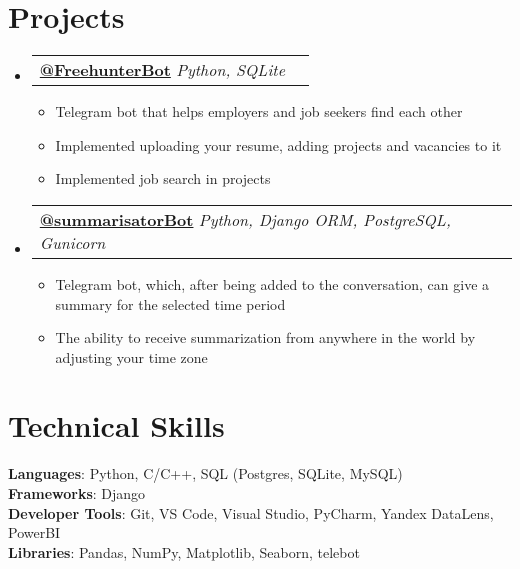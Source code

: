 \documentclass[letterpaper,11pt]{article}
\makeatletter
\newcommand{\resumeItem}[1]{
  \item\small{
    {#1 \vspace{-2pt}}
  }
}
\newcommand{\resumeProjectHeading}[2]{
    \item
    \begin{tabular*}{0.97\textwidth}{l@{\extracolsep{\fill}}r}
      \small#1 & #2 \\
    \end{tabular*}\vspace{-7pt}
}
\newcommand{\resumeSubHeadingListStart}{\begin{itemize}[leftmargin=0.15in, label={}]}
\newcommand{\resumeSubHeadingListEnd}{\end{itemize}}
\newcommand{\resumeItemListStart}{\begin{itemize}}
\newcommand{\resumeItemListEnd}{\end{itemize}\vspace{-5pt}}
\makeatother
\begin{document}
\section{Projects}
    \resumeSubHeadingListStart
      \resumeProjectHeading
        {\textbf{\href{https://t.me/Free_hunterBot}{@FreehunterBot}}
          \emph{Python, SQLite}}{}
          \resumeItemListStart
            \resumeItem{Telegram bot that helps employers and job seekers find each other}
            \resumeItem{Implemented uploading your resume, adding projects and vacancies to it}
            \resumeItem{Implemented job search in projects}
          \resumeItemListEnd
      \resumeProjectHeading
        {\textbf{\href{https://t.me/summarisatorBot}{@summarisatorBot}}
          \emph{Python, Django ORM, PostgreSQL, Gunicorn}}{}
          \resumeItemListStart
            \resumeItem{Telegram bot, which, after being added to the conversation, can give a summary for the selected time period}
            \resumeItem{The ability to receive summarization from anywhere in the world by adjusting your time zone}
          \resumeItemListEnd
    \resumeSubHeadingListEnd



%
\section{Technical Skills}
 \begin{itemize}[leftmargin=0.15in, label={}]
    \small{\item{
     \textbf{Languages}{: Python, C/C++, SQL (Postgres, SQLite, MySQL)} \\
     \textbf{Frameworks}{: Django } \\
     \textbf{Developer Tools}{: Git, VS Code, Visual Studio, PyCharm, Yandex DataLens, PowerBI} \\
     \textbf{Libraries}{: Pandas, NumPy, Matplotlib, Seaborn, telebot}
    }}
 \end{itemize}


\end{document}
